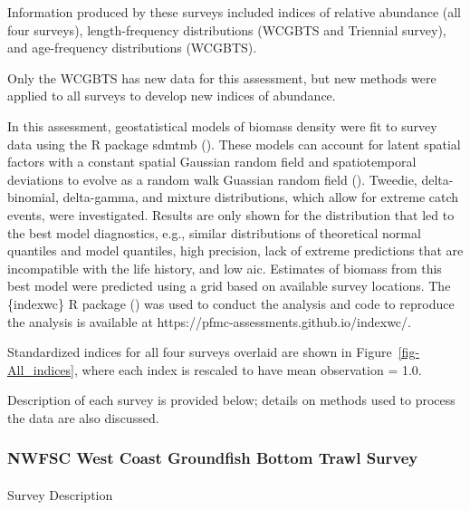 \documentclass[
]{scrartcl}
\makeatletter
\let\oldparagraph\paragraph
\renewcommand{\paragraph}{
    \@ifstar
      \xxxParagraphStar
      \xxxParagraphNoStar
  }
\newcommand{\xxxParagraphStar}[1]{\oldparagraph*{#1}\mbox{}}
\newcommand{\xxxParagraphNoStar}[1]{\oldparagraph{#1}\mbox{}}
\makeatother
\begin{document}
Information produced by these surveys included indices of relative
abundance (all four surveys), length-frequency distributions (WCGBTS and
Triennial survey), and age-frequency distributions (WCGBTS).

Only the WCGBTS has new data for this assessment, but new methods were
applied to all surveys to develop new indices of abundance.

In this assessment, geostatistical models of biomass density were fit to
survey data using the R package \gls{sdmtmb}
(). These models
can account for latent spatial factors with a constant spatial Gaussian
random field and spatiotemporal deviations to evolve as a random walk
Guassian random field (). Tweedie, delta-binomial, delta-gamma, and mixture
distributions, which allow for extreme catch events, were investigated.
Results are only shown for the distribution that led to the best model
diagnostics, e.g., similar distributions of theoretical normal quantiles
and model quantiles, high precision, lack of extreme predictions that
are incompatible with the life history, and low \gls{aic}. Estimates of
biomass from this best model were predicted using a grid based on
available survey locations. The \{indexwc\} R package
() was used to
conduct the analysis and code to reproduce the analysis is available at
https://pfmc-assessments.github.io/indexwc/.

Standardized indices for all four surveys overlaid are shown in
Figure~\ref{fig-All_indices}, where each index is rescaled to have mean
observation = 1.0.

Description of each survey is provided below; details on methods used to
process the data are also discussed.

\subsubsection{NWFSC West Coast Groundfish Bottom Trawl
Survey}\label{nwfsc-west-coast-groundfish-bottom-trawl-survey}

\paragraph{Survey Description}\label{survey-description}
\end{document}
